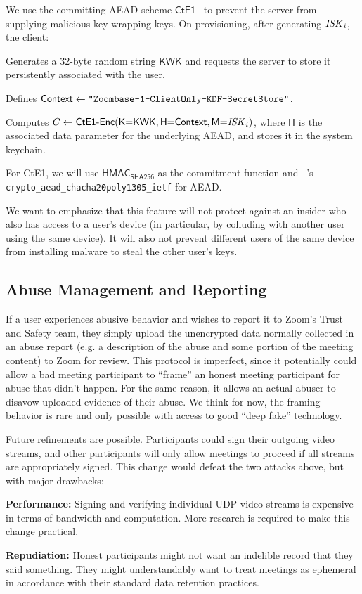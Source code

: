 We use the committing AEAD scheme $\mathsf{CtE1}$~\cite{messagefranking} to prevent the server from supplying malicious key-wrapping keys.
%
On provisioning, after generating $\mathit{ISK}_i$, the client:
\begingroup
\RaggedRight
\begin{enumerate*}
\item Generates a 32-byte random string $\mathsf{KWK}$ and requests the server to store it persistently associated with the user.
\item Defines ${\sf Context} \leftarrow \texttt{"Zoombase-1-ClientOnly-KDF-SecretStore"}$.
\item Computes $C \leftarrow \textsf{CtE1-Enc}(\textsf{K}{=}\textsf{KWK}, \textsf{H}{=}{\sf Context}, \textsf{M}{=}\mathit{ISK}_i)$, where $\textsf{H}$ is the associated data parameter for the underlying AEAD, and stores it in the system keychain.
\end{enumerate*}
\endgroup

For \textsf{CtE1}, we will use $\textsf{HMAC}_{\textsf{SHA256}}$ as the
commitment function and \sodium{}~\cite{libsodium}'s \linebreak \texttt{crypto\_aead\_chacha20poly1305\_ietf} for AEAD.

We want to emphasize that this feature will not protect against an insider who also has access to a
user's device (in particular, by colluding with another user using the same device). It will also not
prevent different users of the same device from installing malware to steal the other user's keys.

\subsection{Abuse Management and Reporting}
If a user experiences abusive behavior and wishes to report it to Zoom's Trust and Safety team, they simply upload the unencrypted data normally collected in an abuse report (e.g. a description of the abuse and some portion of the meeting content) to Zoom for review. This protocol is imperfect, since it potentially could allow a bad meeting participant to ``frame'' an honest meeting participant for abuse that didn't happen. For the same reason, it allows an actual abuser to disavow uploaded evidence of their abuse. We think for now, the framing behavior is rare and only possible with access to good ``deep fake'' technology.

Future refinements are possible. Participants could sign their outgoing video streams, and other participants will only allow meetings to proceed if all streams are appropriately signed. This change would defeat the two attacks above, but with major drawbacks:
%
\begin{description}
    \item {\bf Performance:} Signing and verifying individual UDP video streams is expensive in terms of bandwidth and computation. More research is required to make this change practical.
    \item {\bf Repudiation:} Honest participants might not want an indelible record that they said something. They might understandably want to treat meetings as ephemeral in accordance with their standard data retention practices.
\end{description}

